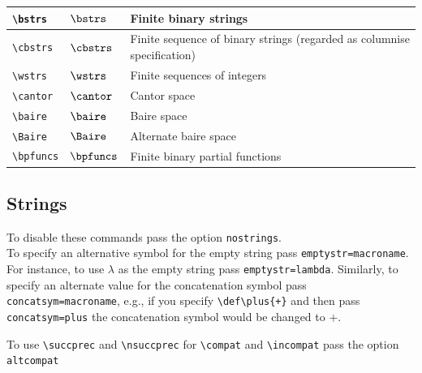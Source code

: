 \documentclass[leqno,11pt]{amsart}
\begin{document}
\begin{tabular}{l |  l | l}\toprule
	\verb=\bstrs=		       & \( \bstrs  \) & Finite binary strings        \\	\midrule
	\verb=\cbstrs=		       & \( \cbstrs  \) & Finite sequence of binary strings (regarded as columnise specification)      \\	\midrule
	\verb=\wstrs=                 & \( \wstrs  \) & Finite sequences of integers \\ 	\midrule
	\verb=\cantor=                & \( \cantor \) & Cantor space		     \\    \midrule
	\verb=\baire=                 & \( \baire  \) & Baire space                  \\[6pt]
	\verb=\Baire=                 & \( \Baire  \) & Alternate baire space        \\ \midrule
	\verb=\bpfuncs= 							& \( \bpfuncs \) & Finite binary partial functions      \\	
		\bottomrule
	\end{tabular}

\subsection{Strings}
To disable these commands pass the option \verb=nostrings=.\\

To specify an alternative symbol for the empty string pass \verb!emptystr=macroname!.  For instance, to use \( \lambda \) as the empty string pass \verb!emptystr=lambda!.  Similarly, to specify an alternate value for the concatenation symbol pass \verb!concatsym=macroname!, e.g., if you specify \verb!\def\plus{+}! and then pass \verb!concatsym=plus! the concatenation symbol would be changed to \( + \). 

To use \verb=\succprec= and \verb=\nsuccprec= for \verb=\compat= and \verb=\incompat= pass the option \verb=altcompat=
\end{document}
